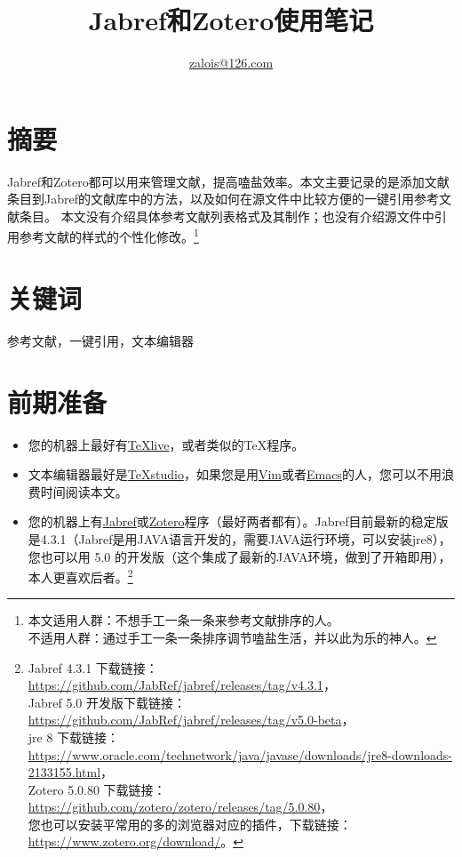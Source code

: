 \documentclass[cn,geye,cyan,normal,14pt]{elegantnote}
\title{Jabref和Zotero使用笔记}
\author{\href{mailto:zalois@126.com}{zalois@126.com}}
\institute{欢迎自由修改分享交流}
\date{\zhtoday}
\begin{document}
\maketitle
\section{摘要}
Jabref和Zotero都可以用来管理文献，提高嗑盐效率。本文主要记录的是添加文献条目到Jabref的文献库中的方法，以及如何在源文件中比较方便的一键引用参考文献条目。
本文没有介绍具体参考文献列表格式及其制作；也没有介绍源文件中引用参考文献的样式的个性化修改。\footnote{本文适用人群：不想手工一条一条来参考文献排序的人。%
\\不适用人群：通过手工一条一条排序调节嗑盐生活，并以此为乐的神人。}
\section{关键词}
参考文献，一键引用，文本编辑器
\section{前期准备}
\begin{itemize}
	\item 您的机器上最好有\href{https://www.tug.org/texlive/}{\TeX live}，或者类似的\TeX 程序。
	\item 文本编辑器最好是\href{https://github.com/texstudio-org/texstudio/releases}{\TeX studio}，如果您是用\href{https://github.com/vim/vim/releases}{Vim}或者\href{https://ftp.gnu.org/gnu/emacs/}{Emacs}的人，您可以不用浪费时间阅读本文。
	\item 您的机器上有\href{https://github.com/JabRef/jabref/releases}{Jabref}或\href{https://github.com/zotero/zotero/releases}{Zotero}程序（最好两者都有）。Jabref目前最新的稳定版是4.3.1（Jabref是用JAVA语言开发的，需要JAVA运行环境，可以安装jre8），您也可以用 5.0 的开发版（这个集成了最新的JAVA环境，做到了开箱即用），本人更喜欢后者。\footnote{Jabref 4.3.1 下载链接：\url{https://github.com/JabRef/jabref/releases/tag/v4.3.1}，\\
		Jabref 5.0 开发版下载链接：\url{https://github.com/JabRef/jabref/releases/tag/v5.0-beta}，\\
		jre 8 下载链接：\url{https://www.oracle.com/technetwork/java/javase/downloads/jre8-downloads-2133155.html}，\\
		Zotero 5.0.80 下载链接：\url{https://github.com/zotero/zotero/releases/tag/5.0.80}，\\
		您也可以安装平常用的多的浏览器对应的插件，下载链接：\url{https://www.zotero.org/download/}。}
\end{itemize}
\end{document}
